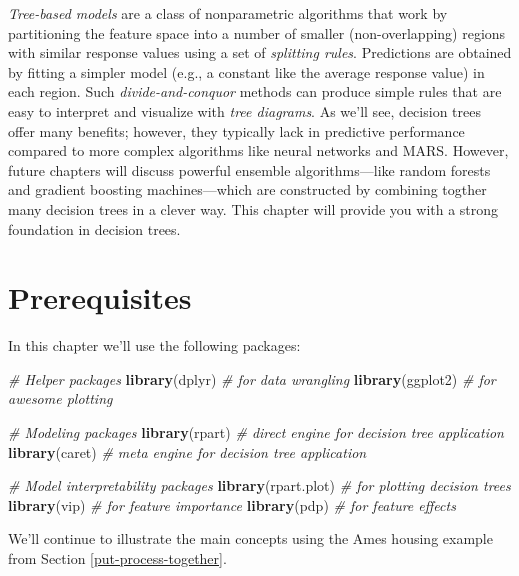 \documentclass[]{krantz}
\makeatletter
\newenvironment{Shaded}{\begin{snugshade}}{\end{snugshade}}
\newcommand{\CommentTok}[1]{\textcolor[rgb]{0.37,0.37,0.37}{\textit{#1}}}
\newcommand{\KeywordTok}[1]{\textcolor[rgb]{0.27,0.27,0.27}{\textbf{#1}}}
\newcommand{\NormalTok}[1]{#1}
\newenvironment{kframe}{%
\medskip{}
\setlength{\fboxsep}{.8em}
 \def\at@end@of@kframe{}%
 \ifinner\ifhmode%
  \def\at@end@of@kframe{\end{minipage}}%
  \begin{minipage}{\columnwidth}%
 \fi\fi%
 \def\FrameCommand##1{\hskip\@totalleftmargin \hskip-\fboxsep
 \colorbox{shadecolor}{##1}\hskip-\fboxsep
     \hskip-\linewidth \hskip-\@totalleftmargin \hskip\columnwidth}%
 \MakeFramed {\advance\hsize-\width
   \@totalleftmargin\z@ \linewidth\hsize
   \@setminipage}}%
 {\par\unskip\endMakeFramed%
 \at@end@of@kframe}
\renewenvironment{Shaded}{\begin{kframe}}{\end{kframe}}
\makeatother
\begin{document}
\emph{Tree-based models} are a class of nonparametric algorithms that work by partitioning the feature space into a number of smaller (non-overlapping) regions with similar response values using a set of \emph{splitting rules}. Predictions are obtained by fitting a simpler model (e.g., a constant like the average response value) in each region. Such \emph{divide-and-conquor} methods can produce simple rules that are easy to interpret and visualize with \emph{tree diagrams}. As we'll see, decision trees offer many benefits; however, they typically lack in predictive performance compared to more complex algorithms like neural networks and MARS. However, future chapters will discuss powerful ensemble algorithms---like random forests and gradient boosting machines---which are constructed by combining togther many decision trees in a clever way. This chapter will provide you with a strong foundation in decision trees.

\hypertarget{prerequisites-7}{%
\section{Prerequisites}\label{prerequisites-7}}

In this chapter we'll use the following packages:

\begin{Shaded}
\begin{Highlighting}[]
\CommentTok{# Helper packages}
\KeywordTok{library}\NormalTok{(dplyr)       }\CommentTok{# for data wrangling}
\KeywordTok{library}\NormalTok{(ggplot2)     }\CommentTok{# for awesome plotting}

\CommentTok{# Modeling packages}
\KeywordTok{library}\NormalTok{(rpart)       }\CommentTok{# direct engine for decision tree application}
\KeywordTok{library}\NormalTok{(caret)       }\CommentTok{# meta engine for decision tree application}

\CommentTok{# Model interpretability packages}
\KeywordTok{library}\NormalTok{(rpart.plot)  }\CommentTok{# for plotting decision trees}
\KeywordTok{library}\NormalTok{(vip)         }\CommentTok{# for feature importance}
\KeywordTok{library}\NormalTok{(pdp)         }\CommentTok{# for feature effects}
\end{Highlighting}
\end{Shaded}

We'll continue to illustrate the main concepts using the Ames housing example from Section \ref{put-process-together}.
\end{document}
